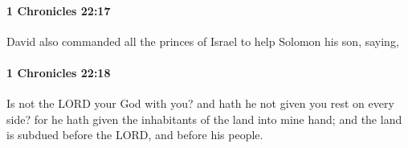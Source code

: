 		\paragraph{1 Chronicles 22:17} %
			\label{1CHRONICLES-22-17}

			David also commanded all the princes of Israel to help Solomon his son, saying,


		\paragraph{1 Chronicles 22:18} %
			\label{1CHRONICLES-22-18}

			Is not the LORD your God with you? and hath he not given you rest on every side? for he hath given the inhabitants of the land into mine hand; and the land is subdued before the LORD, and before his people.



